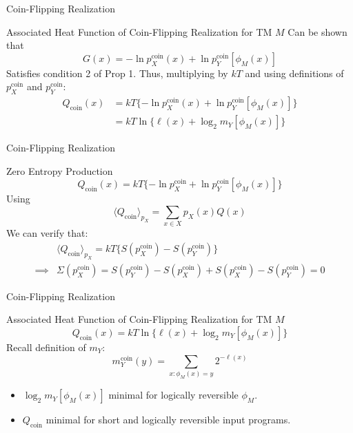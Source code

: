 \documentclass{beamer}
\begin{document}
\begin{frame}{Coin-Flipping Realization}
\begin{block}{Associated Heat Function of Coin-Flipping Realization for TM $M$}
Can be shown that 
\begin{equation*}
    G(x) = -\ln p_X^\text{coin}(x) + \ln p_Y^\text{coin}[\phi_M(x)]
\end{equation*}
Satisfies  condition 2 of Prop 1. Thus, multiplying by $kT$ and using definitions of $p_X^\text{coin}$ and $p_Y^\text{coin}$:
\begin{align*}
    Q_\text{coin}(x) &= kT\{-\ln p_X^\text{coin} (x)+ \ln p_Y^\text{coin}[\phi_M(x)]\}\\
    &= kT\ln \{\ell(x) + \log_2 m_Y[\phi_M(x)]\}
\end{align*}
\end{block}
\end{frame}

\begin{frame}{Coin-Flipping Realization}
    \begin{block}{Zero Entropy Production}
    \begin{equation*}
        Q_\text{coin}(x) = kT\{-\ln p_X^\text{coin} + \ln p_Y^\text{coin}[\phi_M(x)]\}
    \end{equation*}
    Using 
    \begin{equation*}
        \langle Q_\text{coin} \rangle_{p_X}=\sum_{x\in X}p_X(x)Q(x)
    \end{equation*}
    We can verify that:
    \begin{align*}
        &\langle Q_\text{coin}\rangle_{p_X} = kT\{ S(p_X^\text{coin}) - S(p_Y^\text{coin})\}\\
        \implies &\Sigma(p_X^\text{coin}) = S(p_Y^\text{coin}) - S(p_X^\text{coin}) + S(p_X^\text{coin}) - S(p_Y^\text{coin}) = 0
    \end{align*}
    \end{block}
\end{frame}

\begin{frame}{Coin-Flipping Realization}
\begin{block}{Associated Heat Function of Coin-Flipping Realization for TM $M$}
\begin{equation*}
    Q_\text{coin}(x) = kT\ln \{\ell(x) + \log_2 m_Y[\phi_M(x)]\}
\end{equation*}
Recall definition of $m_Y$:
\begin{equation*}
        m_Y^\text{coin}(y) = \sum_{x:\phi_M(x) = y} 2^{-\ell(x)}
    \end{equation*}
\begin{itemize}
    \item $\log_2 m_Y[\phi_M(x)]$ minimal for logically reversible $\phi_M$.
    \item $Q_\text{coin}$ minimal for short and logically reversible input programs.
\end{itemize}
\end{block}
\end{frame}
\end{document}
